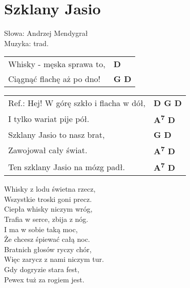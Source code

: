 \section{Szklany Jasio}

Słowa: Andrzej Mendygrał\\
Muzyka:  trad.

\vspace{2em}
\begin{tabular}{@{}p{9cm}@{}l@{}}
Whisky - męska sprawa to, & \bfseries  D \\
Ciągnąć flachę aż po dno! & \bfseries  G D \\
\end{tabular}

\vspace{1em}
\begin{tabular}{@{}p{9cm}@{}l@{}}
Ref.: Hej! W górę szkło i flacha w dół, & \bfseries  D G D \\
I tylko wariat pije pół. & \bfseries  A\textsuperscript{7} D \\
Szklany Jasio to nasz brat, & \bfseries  G D \\
Zawojował cały świat. & \bfseries  A\textsuperscript{7} D \\
Ten szklany Jasio na mózg padł. & \bfseries A\textsuperscript{7} D \\
\end{tabular}

\vspace{1em}
Whisky z lodu świetna rzecz, \\
Wszystkie troski goni precz. \\

Ciepła whisky niczym wróg, \\
Trafia w serce, zbija z nóg. \\

I ma w sobie taką moc, \\
Że chcesz śpiewać całą noc. \\

Bratnich głosów ryczy chór, \\
Więc zarycz z nami niczym tur. \\

Gdy dogryzie stara fest, \\
Pewex tuż za rogiem jest. \\